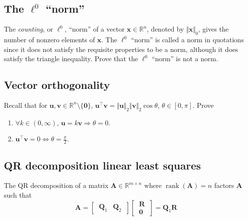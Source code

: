 \documentclass{article}
\numberwithin{equation}{section}
\begin{document}
\subsection{The $ \ell^0 $ ``norm''}

The \textit{counting}, or $ \ell^0 $, ``norm'' of a vector $ \mathbf{x} \in
\mathbb{R}^n $, denoted by $ \Vert\mathbf{x}\Vert_0 $, gives the number of
nonzero elements of $ \mathbf{x} $. The $ \ell^0 $ ``norm'' is called a norm
in quotations since it does not satisfy the requisite properties to be a norm,
although it does satisfy the triangle inequality. Prove that the $ \ell^0 $
``norm'' is not a norm.

\subsection{Vector orthogonality}

Recall that for $ \mathbf{u}, \mathbf{v} \in \mathbb{R}^n \setminus
\{\mathbf{0}\} $, $ \mathbf{u}^\top\mathbf{v} = \Vert\mathbf{u}\Vert_2
\Vert\mathbf{v}\Vert_2\cos\theta $, $ \theta \in [0, \pi] $. Prove
\begin{enumerate}[label = \alph*.]
    \item
    $ \forall k \in (0, \infty) $, $ \mathbf{u} = k\mathbf{v} \Rightarrow
    \theta = 0 $.

    \item
    $ \mathbf{u}^\top\mathbf{v} = 0 \Leftrightarrow \theta = \frac{\pi}{2} $.
\end{enumerate}

\medskip

\subsection{QR decomposition linear least squares}

The QR decomposition of a matrix $ \mathbf{A} \in \mathbb{R}^{m \times n} $
where $ \operatorname{rank}(\mathbf{A}) = n $ factors $ \mathbf{A} $ such that
\cite{bv_convex_opt}
\begin{equation*}
    \mathbf{A} = \begin{bmatrix} \ \mathbf{Q}_1 & \mathbf{Q}_2 \ \end{bmatrix}
    \begin{bmatrix} \ \mathbf{R} \ \\ \ \mathbf{0} \ \end{bmatrix}
     = \mathbf{Q}_1\mathbf{R}
\end{equation*}
\end{document}
